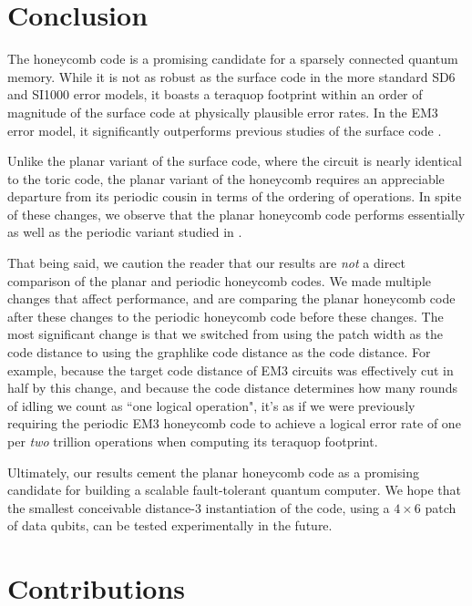 \documentclass[onecolumn,unpublished,a4paper]{quantumarticle}
\theoremstyle{definition}
\theoremstyle{definition}
\theoremstyle{definition}
\begin{document}
\section{Conclusion}
\label{sec:conclusion}

The honeycomb code is a promising candidate for a sparsely connected quantum memory.  
While it is not as robust as the surface code in the more standard SD6 and SI1000 error models, it boasts a teraquop footprint within an order of magnitude of the surface code at physically plausible error rates.  
In the EM3 error model, it significantly outperforms previous studies of the surface code \cite{chao2020optimization}.

Unlike the planar variant of the surface code, where the circuit is nearly identical to the toric code, the planar variant of the honeycomb requires an appreciable departure from its periodic cousin in terms of the ordering of operations.
In spite of these changes, we observe that the planar honeycomb code performs essentially as well as the periodic variant studied in \cite{gidney2021honeycombmemory}.

That being said, we caution the reader that our results are \emph{not} a direct comparison of the planar and periodic honeycomb codes.
We made multiple changes that affect performance, and are comparing the planar honeycomb code after these changes to the periodic honeycomb code before these changes.
The most significant change is that we switched from using the patch width as the code distance to using the graphlike code distance as the code distance.
For example, because the target code distance of EM3 circuits was effectively cut in half by this change, and because the code distance determines how many rounds of idling we count as ``one logical operation", it's as if we were previously requiring the periodic EM3 honeycomb code to achieve a logical error rate of one per \emph{two} trillion operations when computing its teraquop footprint.

Ultimately, our results cement the planar honeycomb code as a promising candidate for building a scalable fault-tolerant quantum computer.
We hope that the smallest conceivable distance-3 instantiation of the code, using a $4\times6$ patch of data qubits, can be tested experimentally in the future.

\section{Contributions}
\end{document}
